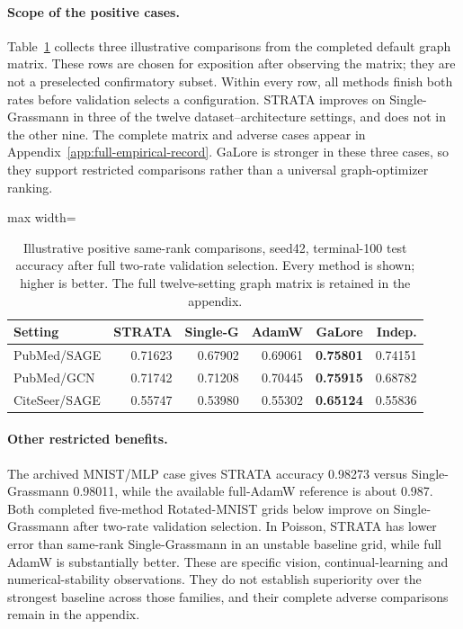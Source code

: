 \paragraph{Scope of the positive cases.}
Table~\ref{tab:positive-cases} collects three illustrative comparisons from the completed default graph matrix. These rows are chosen for exposition after observing the matrix; they are not a preselected confirmatory subset. Within every row, all methods finish both rates before validation selects a configuration. STRATA improves on Single-Grassmann in three of the twelve dataset--architecture settings, and does not in the other nine. The complete matrix and adverse cases appear in Appendix~\ref{app:full-empirical-record}. GaLore is stronger in these three cases, so they support restricted comparisons rather than a universal graph-optimizer ranking.
\begin{table}[t]\centering\footnotesize\setlength{\tabcolsep}{3pt}
\caption{Illustrative positive same-rank comparisons, seed42, terminal-100 test accuracy after full two-rate validation selection. Every method is shown; higher is better. The full twelve-setting graph matrix is retained in the appendix.}
\label{tab:positive-cases}
\begin{adjustbox}{max width=\linewidth}
\begin{tabular}{lrrrrr}\toprule
Setting & STRATA & Single-G & AdamW & GaLore & Indep.\\\midrule
PubMed/SAGE & \cellcolor{oursbg}0.71623 & 0.67902 & 0.69061 & \textbf{0.75801} & 0.74151\\
PubMed/GCN & \cellcolor{oursbg}0.71742 & 0.71208 & 0.70445 & \textbf{0.75915} & 0.68782\\
CiteSeer/SAGE & \cellcolor{oursbg}0.55747 & 0.53980 & 0.55302 & \textbf{0.65124} & 0.55836\\
\bottomrule\end{tabular}
\end{adjustbox}\end{table}
\paragraph{Other restricted benefits.}
The archived MNIST/MLP case gives STRATA accuracy 0.98273 versus Single-Grassmann 0.98011, while the available full-AdamW reference is about 0.987. Both completed five-method Rotated-MNIST grids below improve on Single-Grassmann after two-rate validation selection. In Poisson, STRATA has lower error than same-rank Single-Grassmann in an unstable baseline grid, while full AdamW is substantially better. These are specific vision, continual-learning and numerical-stability observations. They do not establish superiority over the strongest baseline across those families, and their complete adverse comparisons remain in the appendix.
